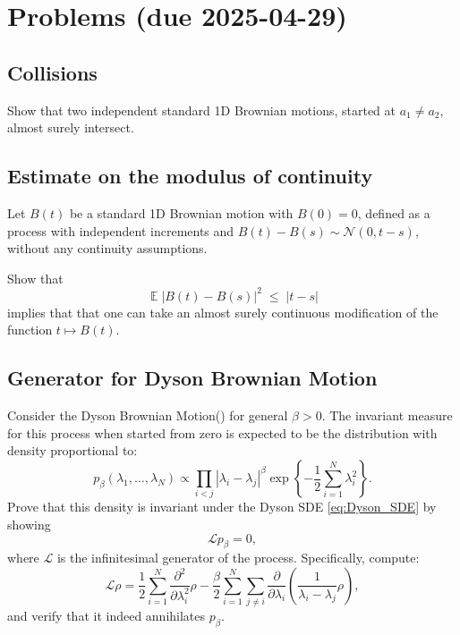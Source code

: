 \documentclass[letterpaper,11pt,oneside,reqno]{article}
\numberwithin{equation}{section}
\theoremstyle{definition}
\begin{document}
\appendix
\setcounter{section}{9}
\section{Problems (due 2025-04-29)}

\subsection{Collisions}

Show that two independent standard 1D Brownian motions, started at $a_1\neq a_2$, almost surely intersect.

\subsection{Estimate on the modulus of continuity}

Let $B(t)$ be a standard 1D Brownian motion with $B(0)=0$,
defined as a process with independent increments and $B(t)-B(s)\sim \mathcal{N}(0,t-s)$,
without any continuity assumptions.

Show that
\begin{equation*}
	\operatorname{\mathbb{E}}|B(t)-B(s)|^2 \;\le\; |t-s|
\end{equation*}
implies that
that one can take an almost
surely continuous modification of the function $t\mapsto B(t)$.

\subsection{Generator for Dyson Brownian Motion}
\label{prob:generator}

Consider the Dyson Brownian Motion() for general $\beta > 0$. The invariant measure for this process when started from zero is expected to be the distribution with density proportional to:
\begin{equation*}
p_{\beta}(\lambda_1,\ldots,\lambda_N) \propto \prod_{i<j}|\lambda_i-\lambda_j|^{\beta} \exp\left\{-\frac{1}{2}\sum_{i=1}^N \lambda_i^2\right\}.
\end{equation*}
Prove that this density is invariant under the Dyson SDE \eqref{eq:Dyson_SDE} by showing
\begin{equation*}
\mathcal{L}p_{\beta} = 0,
\end{equation*}
where $\mathcal{L}$ is the infinitesimal generator of the process. Specifically, compute:
\begin{equation*}
\mathcal{L}\rho = \frac{1}{2}\sum_{i=1}^N
\frac{\partial^2}{\partial \lambda_i^2} \rho-
\frac{\beta}{2}\sum_{i=1}^N\sum_{j\neq
i}
\frac{\partial}{\partial\lambda_i}\left(
\frac{1}{\lambda_i-\lambda_j} \rho
\right),
\end{equation*}
and verify that it indeed annihilates $p_{\beta}$.
\end{document}
